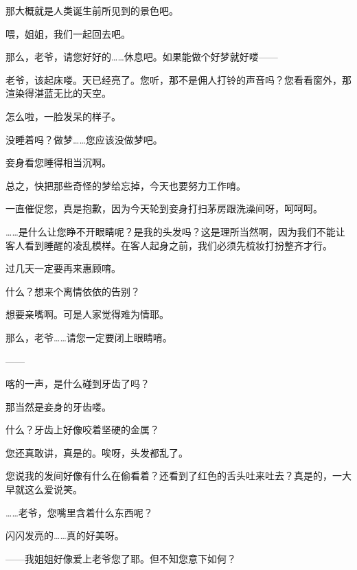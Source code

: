 \documentclass[portrait,a4paper]{article}
\begin{document}
那大概就是人类诞生前所见到的景色吧。

喂，姐姐，我们一起回去吧。

那么，老爷，请您好好的……休息吧。如果能做个好梦就好喽——

老爷，该起床喽。天已经亮了。您听，那不是佣人打铃的声音吗？您看看窗外，那渲染得湛蓝无比的天空。

怎么啦，一脸发呆的样子。

没睡着吗？做梦……您应该没做梦吧。

妾身看您睡得相当沉啊。

总之，快把那些奇怪的梦给忘掉，今天也要努力工作唷。

一直催促您，真是抱歉，因为今天轮到妾身打扫茅房跟洗澡间呀，呵呵呵。

……是什么让您睁不开眼睛呢？是我的头发吗？这是理所当然啊，因为我们不能让客人看到睡醒的凌乱模样。在客人起身之前，我们必须先梳妆打扮整齐才行。

过几天一定要再来惠顾唷。

什么？想来个离情依依的告别？

想要亲嘴啊。可是人家觉得难为情耶。

那么，老爷……请您一定要闭上眼睛唷。

——

喀的一声，是什么碰到牙齿了吗？

那当然是妾身的牙齿喽。

什么？牙齿上好像咬着坚硬的金属？

您还真敢讲，真是的。唉呀，头发都乱了。

您说我的发间好像有什么在偷看着？还看到了红色的舌头吐来吐去？真是的，一大早就这么爱说笑。

……老爷，您嘴里含着什么东西呢？

闪闪发亮的……真的好美呀。

——我姐姐好像爱上老爷您了耶。但不知您意下如何？
\end{document}
